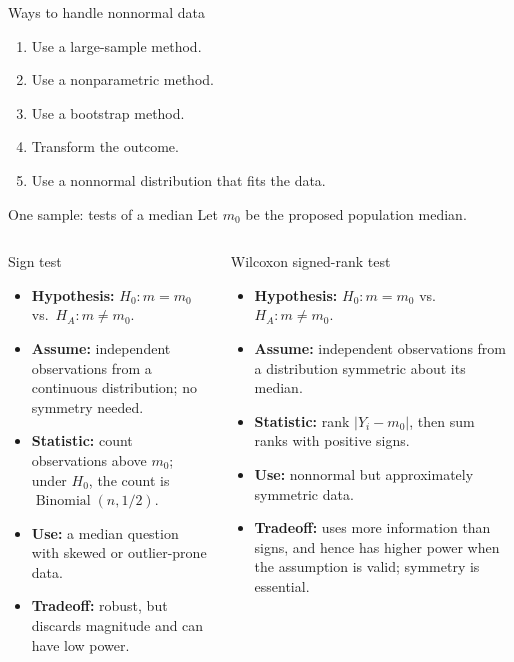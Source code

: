 \documentclass[aspectratio=169,11pt]{beamer}
\begin{document}
\begin{frame}{Ways to handle nonnormal data}
  \large
  \begin{enumerate}
    \item Use a large-sample method.
    \item Use a nonparametric method.
    \item Use a bootstrap method.
    \item Transform the outcome.
    \item Use a nonnormal distribution that fits the data.
  \end{enumerate}
\end{frame}
\begin{frame}{One sample: tests of a median}
  \footnotesize
  Let \(m_0\) be the proposed population median.
  \begin{columns}[T,onlytextwidth]
      \begin{block}{Sign test}
        \begin{itemize}
          \item \textbf{Hypothesis:} \(H_0:m=m_0\) vs.\ \(H_A:m\ne m_0\).
          \item \textbf{Assume:} independent observations from a continuous distribution; no symmetry needed.
          \item \textbf{Statistic:} count observations above \(m_0\); under \(H_0\), the count is \(\operatorname{Binomial}(n,1/2)\).
          \item \textbf{Use:} a median question with skewed or outlier-prone data.
          \item \textbf{Tradeoff:} robust, but discards magnitude and can have low power.
        \end{itemize}
      \end{block}
      \begin{block}{Wilcoxon signed-rank test}
        \begin{itemize}
          \item \textbf{Hypothesis:} \(H_0:m=m_0\) vs.\ \(H_A:m\ne m_0\).
          \item \textbf{Assume:} independent observations from a distribution symmetric about its median.
          \item \textbf{Statistic:} rank \(\lvert Y_i-m_0\rvert\), then sum ranks with positive signs.
          \item \textbf{Use:} nonnormal but approximately symmetric data.
          \item \textbf{Tradeoff:} uses more information than signs, and hence has higher power when the assumption is valid; symmetry is essential.
        \end{itemize}
      \end{block}
  \end{columns}
  \vspace{1mm}
\end{frame}
\end{document}
